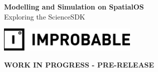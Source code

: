 \documentclass[11pt,fleqn]{book} %
\begin{document}
\setlength{\parskip}{2ex}

\begingroup
\thispagestyle{empty}
\centering
\vspace*{5cm}
\par\normalfont\fontsize{35}{35}\sffamily\selectfont
\textbf{Modelling and Simulation on SpatialOS}\\
{\LARGE Exploring the ScienceSDK}\par %
\vspace*{1cm}
\includegraphics[width=0.5\textwidth]{media/Improbable_full-black.eps}
\par %
\vspace{30mm}
\centering
\color{red} {\LARGE \textbf{WORK IN PROGRESS - PRE-RELEASE}}\color{black}
\endgroup
\end{document}
